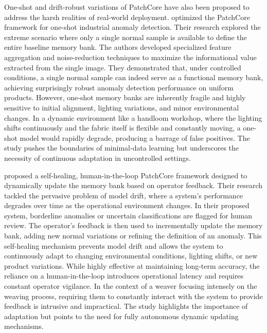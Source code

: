 \documentclass{ieeeaccess}
\begin{document}
One-shot and drift-robust variations of PatchCore have also been proposed to address the harsh realities of real-world deployment. \cite{b17} optimized the PatchCore framework for one-shot industrial anomaly detection. Their research explored the extreme scenario where only a single normal sample is available to define the entire baseline memory bank. The authors developed specialized feature aggregation and noise-reduction techniques to maximize the informational value extracted from the single image. They demonstrated that, under controlled conditions, a single normal sample can indeed serve as a functional memory bank, achieving surprisingly robust anomaly detection performance on uniform products. However, one-shot memory banks are inherently fragile and highly sensitive to initial alignment, lighting variations, and minor environmental changes. In a dynamic environment like a handloom workshop, where the lighting shifts continuously and the fabric itself is flexible and constantly moving, a one-shot model would rapidly degrade, producing a barrage of false positives. The study pushes the boundaries of minimal-data learning but underscores the necessity of continuous adaptation in uncontrolled settings.

\cite{b18} proposed a self-healing, human-in-the-loop PatchCore framework designed to dynamically update the memory bank based on operator feedback. Their research tackled the pervasive problem of model drift, where a system's performance degrades over time as the operational environment changes. In their proposed system, borderline anomalies or uncertain classifications are flagged for human review. The operator's feedback is then used to incrementally update the memory bank, adding new normal variations or refining the definition of an anomaly. This self-healing mechanism prevents model drift and allows the system to continuously adapt to changing environmental conditions, lighting shifts, or new product variations. While highly effective at maintaining long-term accuracy, the reliance on a human-in-the-loop introduces operational latency and requires constant operator vigilance. In the context of a weaver focusing intensely on the weaving process, requiring them to constantly interact with the system to provide feedback is intrusive and impractical. The study highlights the importance of adaptation but points to the need for fully autonomous dynamic updating mechanisms.
\end{document}
